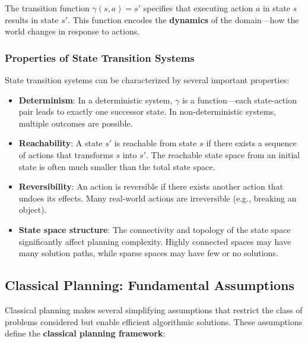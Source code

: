 \documentclass[11pt,a4paper]{article}
\theoremstyle{definition}
\theoremstyle{plain}
\theoremstyle{remark}
\begin{document}
The transition function $\gamma(s, a) = s'$ specifies that executing action $a$ in state $s$ results in state $s'$. This function encodes the \textbf{dynamics} of the domain—how the world changes in response to actions.

\subsubsection{Properties of State Transition Systems}

State transition systems can be characterized by several important properties:

\begin{itemize}
    \item \textbf{Determinism}: In a deterministic system, $\gamma$ is a function—each state-action pair leads to exactly one successor state. In non-deterministic systems, multiple outcomes are possible.
    
    \item \textbf{Reachability}: A state $s'$ is reachable from state $s$ if there exists a sequence of actions that transforms $s$ into $s'$. The reachable state space from an initial state is often much smaller than the total state space.
    
    \item \textbf{Reversibility}: An action is reversible if there exists another action that undoes its effects. Many real-world actions are irreversible (e.g., breaking an object).
    
    \item \textbf{State space structure}: The connectivity and topology of the state space significantly affect planning complexity. Highly connected spaces may have many solution paths, while sparse spaces may have few or no solutions.
\end{itemize}

\subsection{Classical Planning: Fundamental Assumptions}

Classical planning makes several simplifying assumptions that restrict the class of problems considered but enable efficient algorithmic solutions. These assumptions define the \textbf{classical planning framework}:
\end{document}
